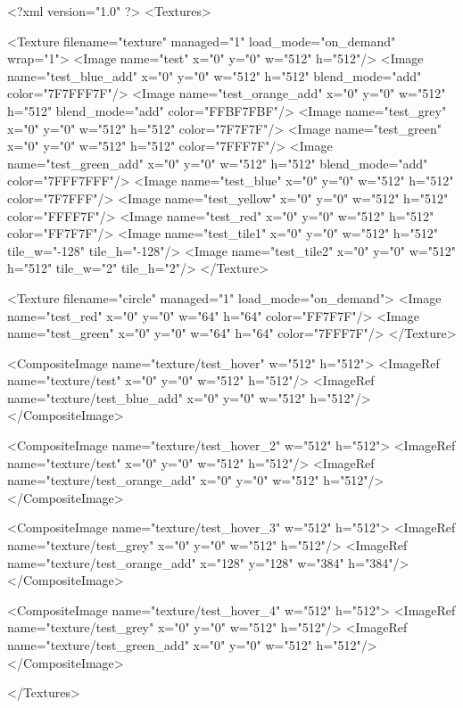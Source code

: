 <?xml version="1.0" ?>
<Textures>

	<Texture filename="texture" managed="1" load_mode="on_demand" wrap="1">
		<Image name="test" x="0" y="0" w="512" h="512"/>
		<Image name="test_blue_add" x="0" y="0" w="512" h="512" blend_mode="add" color="7F7FFF7F"/>
		<Image name="test_orange_add" x="0" y="0" w="512" h="512" blend_mode="add" color="FFBF7FBF"/>
		<Image name="test_grey" x="0" y="0" w="512" h="512" color="7F7F7F"/>
		<Image name="test_green" x="0" y="0" w="512" h="512" color="7FFF7F"/>
		<Image name="test_green_add" x="0" y="0" w="512" h="512" blend_mode="add" color="7FFF7FFF"/>
		<Image name="test_blue" x="0" y="0" w="512" h="512" color="7F7FFF"/>
		<Image name="test_yellow" x="0" y="0" w="512" h="512" color="FFFF7F"/>
		<Image name="test_red" x="0" y="0" w="512" h="512" color="FF7F7F"/>
		<Image name="test_tile1" x="0" y="0" w="512" h="512" tile_w="-128" tile_h="-128"/>
		<Image name="test_tile2" x="0" y="0" w="512" h="512" tile_w="2" tile_h="2"/>
	</Texture>
	
	<Texture filename="circle" managed="1" load_mode="on_demand">
		<Image name="test_red" x="0" y="0" w="64" h="64" color="FF7F7F"/>
		<Image name="test_green" x="0" y="0" w="64" h="64" color="7FFF7F"/>
	</Texture>
	
	<CompositeImage name="texture/test_hover" w="512" h="512">
		<ImageRef name="texture/test" x="0" y="0" w="512" h="512"/>
		<ImageRef name="texture/test_blue_add" x="0" y="0" w="512" h="512"/>
	</CompositeImage>
	
	<CompositeImage name="texture/test_hover_2" w="512" h="512">
		<ImageRef name="texture/test" x="0" y="0" w="512" h="512"/>
		<ImageRef name="texture/test_orange_add" x="0" y="0" w="512" h="512"/>
	</CompositeImage>
	
	<CompositeImage name="texture/test_hover_3" w="512" h="512">
		<ImageRef name="texture/test_grey" x="0" y="0" w="512" h="512"/>
		<ImageRef name="texture/test_orange_add" x="128" y="128" w="384" h="384"/>
	</CompositeImage>
	
	<CompositeImage name="texture/test_hover_4" w="512" h="512">
		<ImageRef name="texture/test_grey" x="0" y="0" w="512" h="512"/>
		<ImageRef name="texture/test_green_add" x="0" y="0" w="512" h="512"/>
	</CompositeImage>
	
</Textures>
